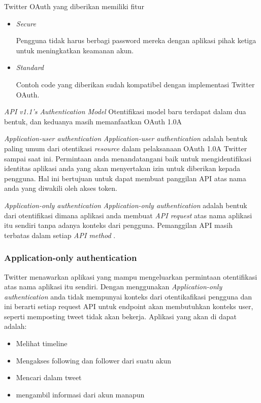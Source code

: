 Twitter OAuth yang diberikan memiliki fitur
\begin{itemize}
	\item \textit{Secure}
	
	Pengguna tidak harus berbagi password mereka dengan aplikasi pihak ketiga untuk meningkatkan keamanan akun.
	\item \textit{Standard}
	
	Contoh code yang diberikan sudah kompatibel dengan implementasi Twitter OAuth.
\end{itemize}

\textit{API v1.1's Authentication Model}
Otentifikasi model baru terdapat dalam dua bentuk, dan keduanya masih memanfaatkan OAuth 1.0A


\textit{Application-user authentication}
\textit{Application-user authentication} adalah bentuk paling umum dari otentikasi \textit{resource} dalam pelaksanaan OAuth 1.0A Twitter sampai saat ini. Permintaan anda menandatangani baik untuk mengidentifikasi identitas aplikasi anda yang akan menyertakan izin untuk diberikan kepada pengguna. Hal ini bertujuan untuk dapat membuat panggilan API atas nama anda yang diwakili oleh akses token.

\textit{Application-only authentication}
\textit{Application-only authentication} adalah bentuk dari otentifikasi dimana aplikasi anda membuat \textit{API request} atas nama aplikasi itu sendiri tanpa adanya konteks dari pengguna. Pemanggilan API masih terbatas dalam setiap \textit{API method} .


\subsubsection{Application-only authentication}
Twitter menawarkan aplikasi yang mampu mengeluarkan permintaan otentifikasi atas nama aplikasi itu sendiri. Dengan menggunakan \textit{Application-only authentication} anda tidak mempunyai konteks dari otentikafikasi pengguna dan ini berarti setiap request API untuk endpoint akan membutuhkan konteks user, seperti memposting tweet tidak akan bekerja. Aplikasi yang akan di dapat adalah: 

\begin{itemize}
	\item Melihat timeline
	\item Mengakses following dan follower dari suatu akun
	\item Mencari dalam tweet
	\item mengambil informasi dari akun manapun
\end{itemize}


